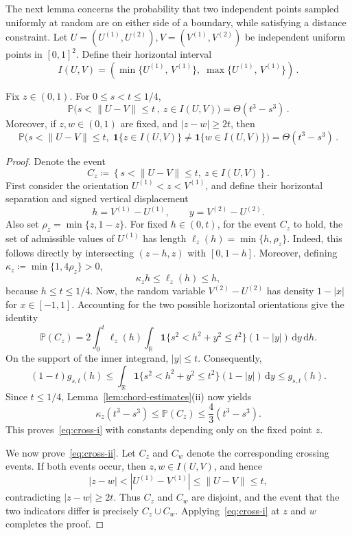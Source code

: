 \documentclass[ECP,preprint]{ejpecp} %
\newcommand{\1}{\mathbf 1}
\renewcommand{\d}{\mathrm d}
\newcommand{\PP}{\mathbb P}
\begin{document}
The next lemma concerns the probability that two independent points sampled uniformly at random are on either side of a boundary, while satisfying a distance constraint. Let \(U=(U^{(1)},U^{(2)}),V=(V^{(1)},V^{(2)})\) be independent uniform points in \([0,1]^2\).  Define their horizontal interval
\[
    I(U,V)
    =
    \left(
        \min\{U^{(1)}, \, V^{(1)}\}  , \;
        \max\{U^{(1)}, \, V^{(1)}\}
    \right) \, .
\]

\begin{lemma} \label{lem:crossing-probability}
Fix \(z\in (0,1)\).  For \(0\le s<t\le 1/4\),
\begin{equation} \label{eq:cross-i}
    \PP\Big(
    s< \|U-V\| \le t \, , \
    z\in I(U,V)
    \Big)
    = \Theta( t^3-s^3 ) \, .
\end{equation}
%
Moreover, if \(z,w\in (0,1) \)  are fixed, and \(|z-w|\ge2t\), then
\begin{equation} \label{eq:cross-ii}
    \PP\Big(
        s<\|U-V\|\le t,\;
        \1\{z\in I(U,V)\}\ne\1\{w\in I(U,V)\}
    \Big)
    = \Theta( t^3-s^3 ) \, .
\end{equation}
\end{lemma}

\begin{proof}
Denote the event
\[
    C_z
    \coloneqq
    \left\{
        s<\|U-V\|\le t,\ z\in I(U,V)
    \right\}.
\]
First consider the orientation \(U^{(1)}<z<V^{(1)}\), and define their horizontal separation and signed vertical displacement
\[
    h=V^{(1)}-U^{(1)},
    \qquad
    y=V^{(2)}-U^{(2)}.
\]
Also set \(\rho_z=\min\{z,1-z\}\). For fixed \(h\in(0,t)\), for the event $C_z$ to hold, the set of
admissible values of \(U^{(1)}\) has length
\(
    \ell_z(h)=\min\{h,\rho_z\}.
\) 
Indeed, this follows directly by intersecting \((z-h,z)\) with
\([0,1-h]\). Moreover, defining $\kappa_z\coloneqq\min\{1,4\rho_z\}>0$,
\[
    \kappa_z h\le \ell_z(h)\le h,
\]
because \(h\le t\le1/4\).
%
Now, the random variable \(V^{(2)}-U^{(2)}\) has density \(1-|x|\) for
\(x\in[-1,1]\). Accounting for the two possible horizontal orientations give
the identity
\[
\PP(C_z)
=
2\int_0^t \ell_z(h)
\int_{\mathbb R}
\1\{s^2<h^2+y^2\le t^2\}(1-|y|)\,\d y\,\d h.
\]
On the support of the inner integrand, \(|y|\le t\). Consequently,
\[
(1-t)g_{s,t}(h)
\le
\int_{\mathbb R}
\1\{s^2<h^2+y^2\le t^2\}(1-|y|)\,\d y
\le
g_{s,t}(h).
\]
Since \(t\le1/4\), Lemma~\ref{lem:chord-estimates}(ii)
now yields
\[
    \kappa_z(t^3-s^3)
    \le
    \PP(C_z)
    \le
    \frac43(t^3-s^3).
\]
This proves~\eqref{eq:cross-i} with constants depending only on the fixed point \(z\).

We now prove~\eqref{eq:cross-ii}. Let \(C_z\) and \(C_w\) denote the corresponding
crossing events. If both events occur, then \(z,w\in I(U,V)\), and hence
\[
    |z-w|
    <
    |U^{(1)}-V^{(1)}|
    \le
    \|U-V\|
    \le t,
\]
contradicting \(|z-w|\ge2t\). Thus \(C_z\) and \(C_w\) are disjoint,
and the event that the two indicators differ is precisely \(C_z\cup C_w\). Applying~\eqref{eq:cross-i} at \(z\) and \(w\) completes
the proof.
\end{proof}
\end{document}
